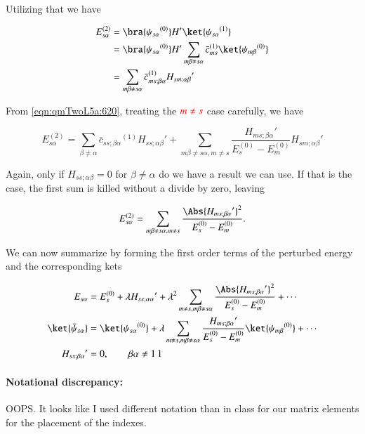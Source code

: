 Utilizing that we have

\begin{align*}
E_{s \alpha}^{(2)} 
&=
\bra{{\psi_{s \alpha}}^{(0)}} H' \ket{{\psi_{s \alpha}}^{(1)}}  \\
&=
\bra{{\psi_{s \alpha}}^{(0)}} H' \sum_{m \beta \ne s \alpha} {\bar{c}_{ms}}^{(1)} \ket{{\psi_{m \beta}}^{(0)}} \\
&=
\sum_{m \beta \ne s \alpha} {\bar{c}_{ms ; \beta \alpha}}^{(1)} {H_{sm ; \alpha \beta}}'
\end{align*}

From \ref{eqn:qmTwoL5a:620}, treating the $\color{red}{m \ne s}$ case carefully, we have

\begin{equation}\label{eqn:qmTwoL5a:700}
E_{s \alpha}^{(2)} 
=
\sum_{\beta \ne \alpha} {\bar{c}_{ss ; \beta \alpha}}^{(1)} {H_{ss ; \alpha \beta}}'
+
\sum_{m \beta \ne s \alpha, m \ne s} 
\frac{{H_{ms ; \beta \alpha}}' }
{ E_s^{(0)} - E_m^{(0)} }
{H_{sm ; \alpha \beta}}'
\end{equation}

Again, only if $H_{ss ; \alpha \beta} = 0$ for $\beta \ne \alpha$ do we have a result we can use.  If that is the case, the first sum is killed without a divide by zero, leaving

\begin{equation}\label{eqn:qmTwoL5a:700b}
E_{s \alpha}^{(2)} 
=
\sum_{m \beta \ne s \alpha, m \ne s} 
\frac{\Abs{{H_{ms ; \beta \alpha}}'}^2 }
{ E_s^{(0)} - E_m^{(0)} }.
\end{equation}

We can now summarize by forming the first order terms of the perturbed energy and the corresponding kets

\begin{align}\label{eqn:qmTwoL5a:720}
E_{s \alpha} &= E_s^{(0)} + \lambda {H_{ss ; \alpha \alpha}}' + \lambda^2 
\sum_{m \ne s, m \beta \ne s \alpha} 
\frac{\Abs{{H_{ms ; \beta \alpha}}'}^2 }
{ E_s^{(0)} - E_m^{(0)} } 
+ \cdots
\\
\ket{\bar{\psi}_{s \alpha}} &= \ket{{\psi_{s \alpha}}^{(0)}} + \lambda
\sum_{m \ne s, m \beta \ne s \alpha} 
\frac{{H_{ms ; \beta \alpha}}'}
{ E_s^{(0)} - E_m^{(0)} } \ket{{\psi_{m \beta}}^{(0)}}
+ \cdots \\
{H_{ss ; \beta \alpha}}' &= 0, \qquad \beta \alpha \ne 1\,1
\end{align}

\paragraph{Notational discrepancy:} OOPS.  It looks like I used different notation than in class for our matrix elements for the placement of the indexes.

